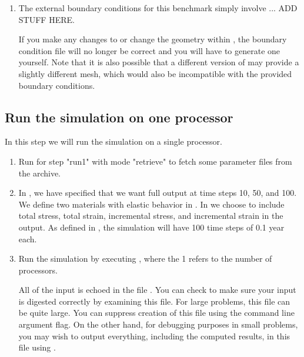 \begin{enumerate}
\item The external boundary conditions for this benchmark simply
  involve ... ADD STUFF HERE.

  \begin{warning}
    If you make any changes to  or change the
    geometry within , the boundary condition file
     will no longer be correct and you will
    have to generate one yourself.  Note that it is also possible that
    a different version of  may provide a slightly
    different mesh, which would also be incompatible with the provided
    boundary conditions.
  \end{warning}
\end{enumerate}

\subsection{Run the simulation on one processor}

In this step we will run the simulation on a single processor.

\begin{enumerate}
\item Run  for step "run1" with mode "retrieve" to
  fetch some parameter files from the archive.

  \begin{screen}
    \shellprompt{}
  \end{screen}
  
\item In , we have specified that we want
  full output at time steps 10, 50, and 100. We define two materials
  with elastic behavior in
  . In  we choose to
  include total stress, total strain, incremental stress, and
  incremental strain in the output. As defined in
  , the simulation will have 100 time steps of
  0.1 year each.
\item Run the simulation by executing , where
  the 1 refers to the number of processors.

  \begin{tip}
    All of the input is echoed in the file .
    You can check to make sure your input is digested correctly by
    examining this file. For large problems, this file can be quite
    large. You can suppress creation of this file using the command
    line argument  flag. On the
    other hand, for debugging purposes in small problems, you may wish
    to output everything, including the computed results, in this file
    using .
  \end{tip}
  
  \begin{screen}
    \shellprompt{}
  \end{screen}
\end{enumerate}

